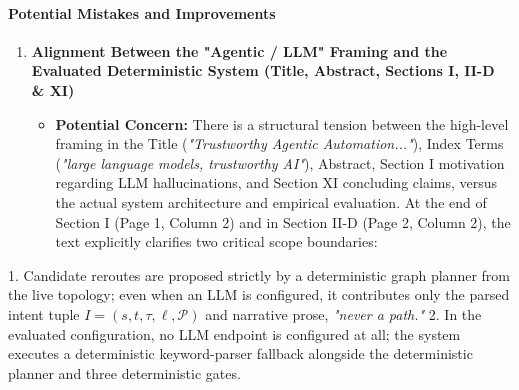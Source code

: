 \documentclass[11pt,a4paper]{article}
\begin{document}
\paragraph{Potential Mistakes and Improvements}
\begin{enumerate}[leftmargin=1.6em,itemsep=3pt]
\item \textbf{Alignment Between the "Agentic / LLM" Framing and the Evaluated Deterministic System (Title, Abstract, Sections I, II-D \& XI)}
\begin{itemize}[leftmargin=1.8em,itemsep=2pt]
\item \textbf{Potential Concern:} There is a structural tension between the high-level framing in the Title (\emph{"Trustworthy Agentic Automation..."}), Index Terms (\emph{"large language models, trustworthy AI"}), Abstract, Section I motivation regarding LLM hallucinations, and Section XI concluding claims, versus the actual system architecture and empirical evaluation. At the end of Section I (Page 1, Column 2) and in Section II-D (Page 2, Column 2), the text explicitly clarifies two critical scope boundaries:
\end{itemize}
\end{enumerate}
1. Candidate reroutes are proposed strictly by a deterministic graph planner from the live topology; even when an LLM is configured, it contributes only the parsed intent tuple $I = (s, t, \tau, \ell, \mathcal{P})$ and narrative prose, \emph{"never a path."}
2. In the evaluated configuration, no LLM endpoint is configured at all; the system executes a deterministic keyword-parser fallback alongside the deterministic planner and three deterministic gates.
\end{document}
